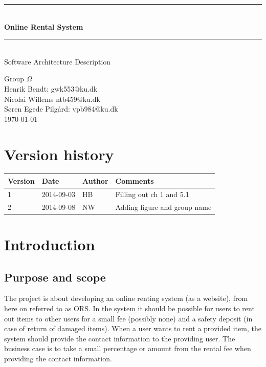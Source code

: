 \documentclass[a4paper,11pt]{report}
\makeatletter
\newcommand{\systemname}{Online Rental System}
\newcommand{\groupname}{Group $\Omega$}
\newcommand{\contactdetails}{Henrik Bendt: gwk553@ku.dk\\Nicolai Willems ntb459@ku.dk\\Søren Egede Pilgård: vpb984@ku.dk}
\makeatother
\begin{document}
%
%
\newcommand{\HRule}{\rule{\linewidth}{0.5mm}}
\begin{titlepage}

  \begin{center}

    \vspace*{4cm}
    \HRule \\[0.4cm]
    { \huge \bfseries \systemname}\\[0.4cm]
    \HRule \\[1.5cm]

    {\Large Software Architecture Description}

    \vfill
  \end{center}

  \begin{flushleft}
    {\LARGE \groupname}\\[0.2cm]
    {\large \contactdetails}\\[0.2cm]
   {\large \today}
  \end{flushleft}
\end{titlepage}

%
%
\newpage
\chapter*{Version history}

\begin{center}
  \begin{tabular}[h!]{| l | l | l | p{8 cm} |}
    \hline
    \rowcolor{gray}
    Version & Date & Author & Comments \\
    \hline
    \hline
    1 & 2014-09-03 & HB & Filling out ch 1 and 5.1\\
    \hline
    2 & 2014-09-08 & NW & Adding figure and group name \\
  \end{tabular}
\end{center}

%
%
\setcounter{tocdepth}{1}
\tableofcontents

%
%
\chapter{Introduction}
\label{cha:introduction}
\thispagestyle{fancy}


\section{Purpose and scope}
\label{sec:purpose-scope}
The project is about developing an online renting system (as a website), from
here on referred to as ORS. In the system it should be possible for users to
rent out items to other users for a small fee (possibly none) and a safety
deposit (in case of return of damaged items). When a user wants to rent a
provided item, the system should provide the contact information to the
providing user. The business case is to take a small percentage or amount from
the rental fee when providing the contact information.
\end{document}
